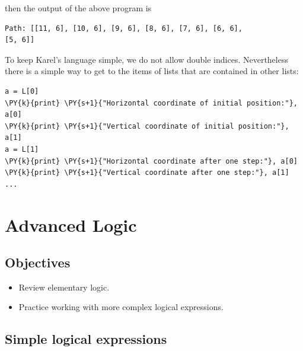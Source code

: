 \noindent
then the output of the above program is\\

\begin{ybox}
\begin{Verbatim}[commandchars=\\\{\}]
Path: [[11, 6], [10, 6], [9, 6], [8, 6], [7, 6], [6, 6], 
[5, 6]]
\end{Verbatim}
\end{ybox}
\vspace{6mm}

\noindent
To keep Karel's language simple, we do not allow double indices. Nevertheless
there is a simple way to get to the items of lists that are contained in other lists:\\

\begin{bbox}
\begin{Verbatim}[commandchars=\\\{\}]
a = L[0]
\PY{k}{print} \PY{s+1}{"Horizontal coordinate of initial position:"}, a[0]
\PY{k}{print} \PY{s+1}{"Vertical coordinate of initial position:"}, a[1]
a = L[1]
\PY{k}{print} \PY{s+1}{"Horizontal coordinate after one step:"}, a[0]
\PY{k}{print} \PY{s+1}{"Vertical coordinate after one step:"}, a[1]
...
\end{Verbatim}
\end{bbox}


\section{Advanced Logic} \label{sec:logic} 

\subsection[\ \ Objectives]{Objectives} 
 
\begin{itemize}
\item Review elementary logic.
\item Practice working with more complex logical expressions.
\end{itemize}

\subsection[\ \ Simple logical expressions]{Simple logical expressions}

